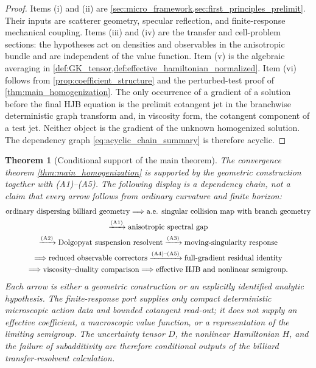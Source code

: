 \documentclass[12pt, letterpaper]{amsart}
\theoremstyle{plain}
\newtheorem{theorem}{Theorem}[section]
\theoremstyle{definition}
\theoremstyle{remark}
\begin{document}
\begin{proof}
Items (i) and (ii) are \cref{sec:micro_framework,sec:first_principles_prelimit}.
Their inputs are scatterer geometry, specular reflection, and finite-response
mechanical coupling.  Items (iii) and (iv) are the transfer and cell-problem
  sections: the hypotheses act on densities and observables in the anisotropic
bundle and are independent of the value function.  Item (v) is the algebraic
averaging in \cref{def:GK_tensor,def:effective_hamiltonian_normalized}.  Item
(vi) follows from \cref{prop:coefficient_structure} and the perturbed-test proof
of \cref{thm:main_homogenization}.  The only occurrence of a gradient of a
solution before the final HJB equation is the prelimit cotangent jet in the
branchwise deterministic graph transform and, in viscosity form, the cotangent
component of a test jet.  Neither object is the gradient of the unknown
homogenized solution.  The dependency graph \eqref{eq:acyclic_chain_summary} is
therefore acyclic.
\end{proof}



\begin{theorem}[Conditional support of the main theorem]
\label{thm:maximal_deterministic_support_main}
The convergence theorem \cref{thm:main_homogenization} is supported by the
geometric construction together with \textup{(A1)--(A5)}.  The following display
is a dependency chain, not a claim that every arrow follows from ordinary
curvature and finite horizon:
\begin{equation}
\label{eq:maximal_deterministic_support_chain}
\begin{gathered}
\text{ordinary dispersing billiard geometry}
\Longrightarrow
\text{a.e. singular collision map with branch geometry}\\
\xrightarrow{\textup{(A1)}}
\text{anisotropic spectral gap}\\
\xrightarrow{\textup{(A2)}}
\text{Dolgopyat suspension resolvent}
\xrightarrow{\textup{(A3)}}
\text{moving-singularity response}\\
\Longrightarrow
\text{reduced observable correctors}
\xrightarrow{\textup{(A4)--(A5)}}
\text{full-gradient residual identity}\\
\Longrightarrow
\text{viscosity--duality comparison}
\Longrightarrow
\text{effective HJB and nonlinear semigroup.}
\end{gathered}
\end{equation}
Each arrow is either a geometric construction or an explicitly identified
analytic hypothesis.  The
finite-response port supplies only compact deterministic microscopic action data
and bounded cotangent read-out; it does not supply an effective coefficient, a
macroscopic value function, or a representation of the limiting semigroup.  The
uncertainty tensor $D$, the nonlinear Hamiltonian $H$, and the failure of
subadditivity are therefore conditional outputs of the billiard
transfer-resolvent calculation.
\end{theorem}
\end{document}
